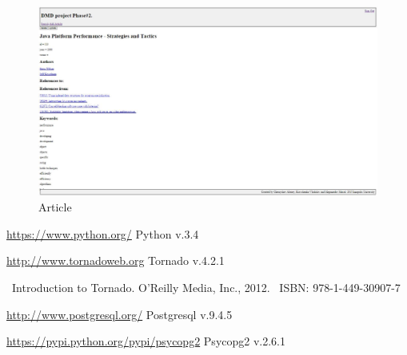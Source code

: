 \documentclass{article}
\begin{document}
~
~
\begin{figure}[h!]
  \centering
      \includegraphics[width=16cm]{4.jpg}
  \caption{Article}
\end{figure}


\vfill

\newpage
\begin{thebibliography}{1}

\url{https://www.python.org/} Python v.3.4

\url{http://www.tornadoweb.org} Tornado v.4.2.1

\ Introduction to Tornado. O’Reilly Media, Inc., 2012. \ ISBN: 978-1-449-30907-7

\url{http://www.postgresql.org/} Postgresql v.9.4.5

\url{https://pypi.python.org/pypi/psycopg2} Psycopg2 v.2.6.1


\end{thebibliography}
\end{document}
